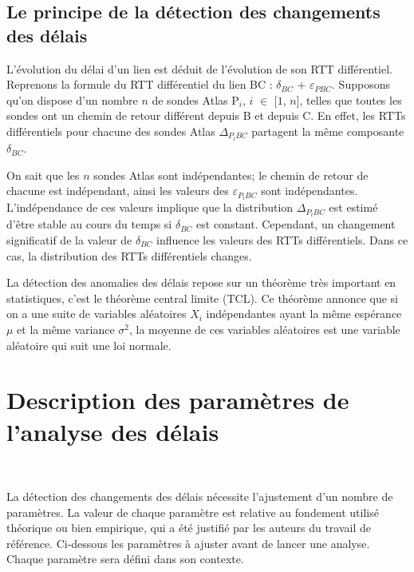 \subsection{Le principe de la détection des changements des délais}

L'évolution du délai d'un lien est déduit de l'évolution de son RTT différentiel. Reprenons la formule du RTT différentiel du lien BC :  $\delta_{BC}$ + $\varepsilon_{PBC}$. Supposons qu'on dispose d'un nombre $n$ de sondes Atlas P$_i$, $i$ $\in$ [$1$, $n$], telles que toutes les sondes ont un chemin de retour différent depuis B et depuis C.  En effet, les RTTs différentiels pour chacune des sondes Atlas $\Delta_{P{_i}BC}$ partagent la même composante $\delta_{BC}$.

On sait que les $n$ sondes Atlas sont indépendantes; le chemin de retour de chacune est indépendant, ainsi les valeurs des  $\varepsilon_{P_{i}BC}$ sont  indépendantes. L'indépendance de ces valeurs implique que la distribution $\Delta_{P_{i}BC}$ est estimé d'être stable au cours du temps si $\delta_{BC}$ est constant. Cependant, un changement significatif de la valeur de $\delta_{BC}$ influence les valeurs des RTTs différentiels. Dans ce cas, la distribution des RTTs différentiels changes. 


La détection des anomalies des délais repose sur un théorème très important en statistiques, c'est le théorème  central limite (TCL). Ce théorème  annonce que si on a une suite de variables aléatoires $X_i$ indépendantes ayant la même espérance $\mu$ et la même variance $\sigma^2$, la moyenne de ces variables aléatoires est une variable aléatoire qui suit une loi normale. 




\section{Description des paramètres de l'analyse des délais} \label{par:parametre-de-lanalyse}~

La détection des changements des délais nécessite l'ajustement d'un nombre de paramètres. La valeur de chaque paramètre est relative au  fondement utilisé théorique ou bien empirique, qui a été  justifié par les auteurs du travail de référence.   Ci-dessous les paramètres à ajuster avant de lancer une analyse.  Chaque paramètre sera défini dans son contexte.

